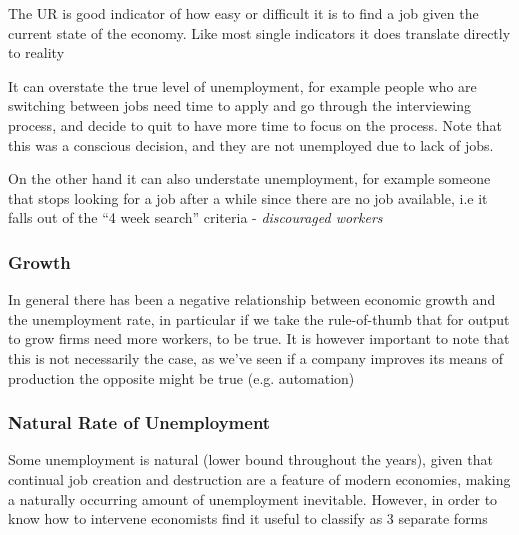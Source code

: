 \documentclass[english,course]{Notes}
\newcommand{\ita}[1]{\textit{#1}}
\begin{document}
\par{The UR is good indicator of how easy or difficult it is
to find a job given the current state of the economy. Like most single indicators it does translate directly to reality}
\par{It can overstate the true level of unemployment, for example people who are switching between jobs need time to apply and go through the interviewing process, and decide to quit to have more time to focus on the process. Note that this was a conscious decision, and they are not unemployed due to lack of jobs.
\par{ On the other hand it can also understate unemployment, for example someone that stops looking for a job after a while since there are no job available, i.e it falls out of the ``4 week search'' criteria - \ita{discouraged workers}}



\subsubsection{Growth}

\par{In general there has been a negative relationship between economic growth and the unemployment rate, in particular if we take the rule-of-thumb that for output to grow firms need more workers, to be true. It is however important to note that this is not necessarily the case, as we've seen if a company improves its means of production the opposite might be true (e.g. automation)}


\subsubsection{Natural Rate of Unemployment}

\par{Some unemployment is natural (lower bound throughout the years), given that continual job creation and destruction are a feature of
modern economies, making a naturally occurring amount
of unemployment inevitable. However, in order to know how to intervene economists find it useful to classify as 3 separate forms}

}
\end{document}
